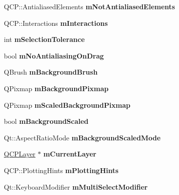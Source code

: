 \begin{DoxyCompactItemize}
Q\+C\+P\+::\+Antialiased\+Elements {\bfseries m\+Not\+Antialiased\+Elements}
\item 
\mbox{\label{classQCustomPlot_ad717377ceba7493b4b32f0bcbbdf1895}} 
Q\+C\+P\+::\+Interactions {\bfseries m\+Interactions}
\item 
\mbox{\label{classQCustomPlot_abc36e12dd0482117ad810a800c847722}} 
int {\bfseries m\+Selection\+Tolerance}
\item 
\mbox{\label{classQCustomPlot_ac83df968435f6b8ec79f2993ab9124e8}} 
bool {\bfseries m\+No\+Antialiasing\+On\+Drag}
\item 
\mbox{\label{classQCustomPlot_a3aef5de4ac012178e3293248e9c63737}} 
Q\+Brush {\bfseries m\+Background\+Brush}
\item 
\mbox{\label{classQCustomPlot_ae8f4677399324a78c5f8dbfb95a34f90}} 
Q\+Pixmap {\bfseries m\+Background\+Pixmap}
\item 
\mbox{\label{classQCustomPlot_a081bf046501d52642dc6d7e3bdb97d57}} 
Q\+Pixmap {\bfseries m\+Scaled\+Background\+Pixmap}
\item 
\mbox{\label{classQCustomPlot_a62fe584b20680b1b2e1c7efb5c5416a5}} 
bool {\bfseries m\+Background\+Scaled}
\item 
\mbox{\label{classQCustomPlot_ab82e8a5e3ad6b486f95d6da8bf49e9aa}} 
Qt\+::\+Aspect\+Ratio\+Mode {\bfseries m\+Background\+Scaled\+Mode}
\item 
\mbox{\label{classQCustomPlot_aa27569c92e74395af10151357d268628}} 
\hyperlink{classQCPLayer}{Q\+C\+P\+Layer} $\ast$ {\bfseries m\+Current\+Layer}
\item 
\mbox{\label{classQCustomPlot_aa184197a6101a9cc5807469e1d006c9e}} 
Q\+C\+P\+::\+Plotting\+Hints {\bfseries m\+Plotting\+Hints}
\item 
\mbox{\label{classQCustomPlot_a0e97e701c5671e7e463d2ce0211d0f8a}} 
Qt\+::\+Keyboard\+Modifier {\bfseries m\+Multi\+Select\+Modifier}

\end{DoxyCompactItemize}
